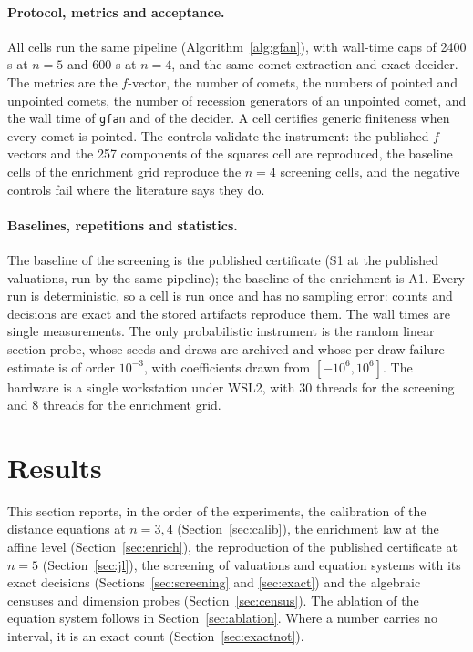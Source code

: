 \documentclass[11pt]{article}
\theoremstyle{definition}
\theoremstyle{remark}
\begin{document}
\paragraph{Protocol, metrics and acceptance.}
All cells run the same pipeline (Algorithm~\ref{alg:gfan}), with wall-time caps of 2400 s at $n=5$ and 600 s at $n=4$, and the same comet extraction
and exact decider. The metrics are the $f$-vector, the number of comets, the numbers of pointed and unpointed comets, the number of recession
generators of an unpointed comet, and the wall time of \texttt{gfan} and of the decider. A cell certifies generic finiteness when every comet is
pointed. The controls validate the instrument: the published $f$-vectors and the 257 components of the squares cell are reproduced, the baseline cells of
the enrichment grid reproduce the $n=4$ screening cells, and the negative controls fail where the literature says they do.

\paragraph{Baselines, repetitions and statistics.}
The baseline of the screening is the published certificate (S1 at the published valuations, run by the same pipeline); the baseline of the enrichment is A1.
Every run is deterministic, so a cell is run once and has no sampling error: counts and decisions are exact and the stored artifacts reproduce them. The wall times are
single measurements. The only probabilistic instrument is the random linear section probe, whose seeds and draws are archived and whose per-draw failure estimate
is of order $10^{-3}$, with coefficients drawn from $[-10^6,10^6]$. The hardware is a single workstation under WSL2, with 30 threads for the screening and
8 threads for the enrichment grid.

\section{Results}\label{sec:results}

This section reports, in the order of the experiments, the calibration of the distance equations at $n=3,4$ (Section~\ref{sec:calib}), the enrichment law
at the affine level (Section~\ref{sec:enrich}), the reproduction of the published certificate at $n=5$ (Section~\ref{sec:jl}), the screening of valuations and
equation systems with its exact decisions (Sections~\ref{sec:screening} and \ref{sec:exact}) and the algebraic censuses and dimension probes
(Section~\ref{sec:census}). The ablation of the equation system follows in Section~\ref{sec:ablation}. Where a number carries no interval, it is an
exact count (Section~\ref{sec:exactnot}).
\end{document}
